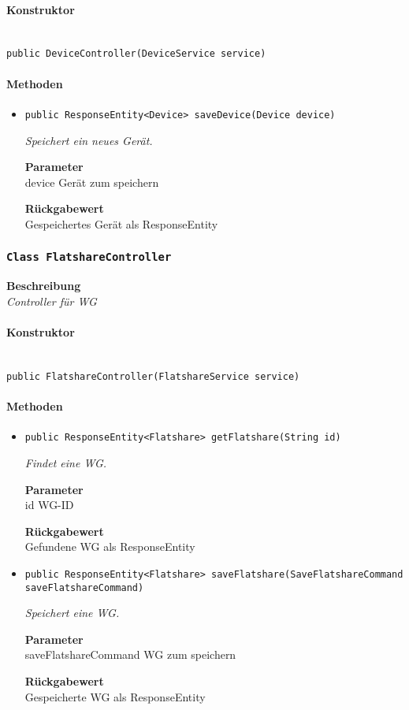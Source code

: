      \paragraph*{Konstruktor}\mbox{} \\
     \texttt{public DeviceController(DeviceService service)} \\
     \paragraph*{Methoden}
     \begin{itemize}
     	\item{\texttt{public ResponseEntity<Device> saveDevice(Device device)}}
     	
     	\textit{Speichert ein neues Gerät.}
     	
     	\textbf{Parameter} \\
     	device Gerät zum speichern
     	
     	\textbf{Rückgabewert} \\
     	Gespeichertes Gerät als ResponseEntity
     \end{itemize}
     \subsubsection{\texttt{Class FlatshareController}}
     \textbf{Beschreibung} \\
     \textit{Controller für WG}
     \paragraph*{Konstruktor}\mbox{} \\
     \texttt{public FlatshareController(FlatshareService service)} \\
     \paragraph*{Methoden}
     \begin{itemize}
     	\item{\texttt{public ResponseEntity<Flatshare> getFlatshare(String id)}}
     	
     	\textit{Findet eine WG.}
     	
     	\textbf{Parameter} \\
     	id WG-ID
     	
     	\textbf{Rückgabewert} \\
     	Gefundene WG als ResponseEntity        \item{\texttt{public ResponseEntity<Flatshare> saveFlatshare(SaveFlatshareCommand saveFlatshareCommand)}}
     	
     	\textit{Speichert eine WG.}
     	
     	\textbf{Parameter} \\
     	saveFlatshareCommand WG zum speichern
     	
     	\textbf{Rückgabewert} \\
     	Gespeicherte WG als ResponseEntity
     \end{itemize}
